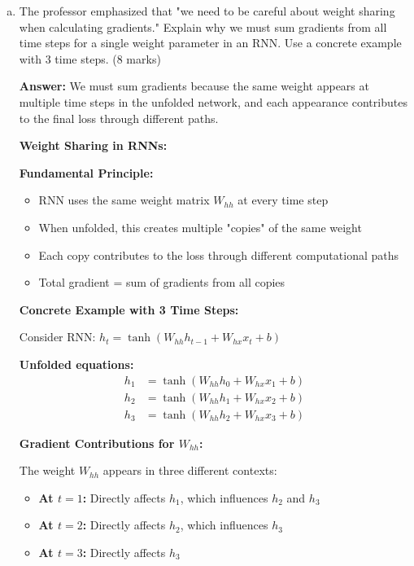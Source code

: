 \documentclass[12pt]{article}
\newcommand{\answer}[1]{{\color{answercolor}\textbf{Answer:} #1}}
\newcommand{\explanation}[1]{{\color{explanationcolor}#1}}
\begin{document}
\begin{enumerate}[(a)]
    \item The professor emphasized that "we need to be careful about weight sharing when calculating gradients." Explain why we must sum gradients from all time steps for a single weight parameter in an RNN. Use a concrete example with 3 time steps. \hfill (8 marks)
    
    \answer{We must sum gradients because the same weight appears at multiple time steps in the unfolded network, and each appearance contributes to the final loss through different paths.}
    
    \explanation{
    \textbf{Weight Sharing in RNNs:}
    
    \textbf{Fundamental Principle:}
    \begin{itemize}
        \item RNN uses the same weight matrix $W_{hh}$ at every time step
        \item When unfolded, this creates multiple "copies" of the same weight
        \item Each copy contributes to the loss through different computational paths
        \item Total gradient = sum of gradients from all copies
    \end{itemize}
    
    \textbf{Concrete Example with 3 Time Steps:}
    
    Consider RNN: $h_t = \tanh(W_{hh} h_{t-1} + W_{hx} x_t + b)$
    
    \textbf{Unfolded equations:}
    \begin{align}
    h_1 &= \tanh(W_{hh} h_0 + W_{hx} x_1 + b) \\
    h_2 &= \tanh(W_{hh} h_1 + W_{hx} x_2 + b) \\
    h_3 &= \tanh(W_{hh} h_2 + W_{hx} x_3 + b)
    \end{align}
    
    \textbf{Gradient Contributions for $W_{hh}$:}
    
    The weight $W_{hh}$ appears in three different contexts:
    \begin{itemize}
        \item \textbf{At $t=1$:} Directly affects $h_1$, which influences $h_2$ and $h_3$
        \item \textbf{At $t=2$:} Directly affects $h_2$, which influences $h_3$
        \item \textbf{At $t=3$:} Directly affects $h_3$
    \end{itemize}
    
}
\end{enumerate}
\end{document}
